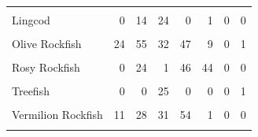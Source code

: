 \documentclass[
]{article}
\begin{document}
\begin{table}
\begin{tabular}[t]{lrrrrrrr}
\cellcolor{gray!6}{Kelp Rockfish} & \cellcolor{gray!6}{0} & \cellcolor{gray!6}{17} & \cellcolor{gray!6}{10} & \cellcolor{gray!6}{0} & \cellcolor{gray!6}{0} & \cellcolor{gray!6}{0} & \cellcolor{gray!6}{1}\\
Lingcod & 0 & 14 & 24 & 0 & 1 & 0 & 0\\
\cellcolor{gray!6}{Olive or Yellowtail Rockfish} & \cellcolor{gray!6}{0} & \cellcolor{gray!6}{0} & \cellcolor{gray!6}{1} & \cellcolor{gray!6}{0} & \cellcolor{gray!6}{0} & \cellcolor{gray!6}{0} & \cellcolor{gray!6}{0}\\
\addlinespace
Olive Rockfish & 24 & 55 & 32 & 47 & 9 & 0 & 1\\
\cellcolor{gray!6}{Quillback Rockfish} & \cellcolor{gray!6}{0} & \cellcolor{gray!6}{0} & \cellcolor{gray!6}{0} & \cellcolor{gray!6}{63} & \cellcolor{gray!6}{19} & \cellcolor{gray!6}{0} & \cellcolor{gray!6}{0}\\
Rosy Rockfish & 0 & 24 & 1 & 46 & 44 & 0 & 0\\
\cellcolor{gray!6}{Starry Rockfish} & \cellcolor{gray!6}{0} & \cellcolor{gray!6}{0} & \cellcolor{gray!6}{1} & \cellcolor{gray!6}{4} & \cellcolor{gray!6}{0} & \cellcolor{gray!6}{0} & \cellcolor{gray!6}{1}\\
Treefish & 0 & 0 & 25 & 0 & 0 & 0 & 1\\
\addlinespace
\cellcolor{gray!6}{UnID Blue Rockfish} & \cellcolor{gray!6}{0} & \cellcolor{gray!6}{0} & \cellcolor{gray!6}{0} & \cellcolor{gray!6}{0} & \cellcolor{gray!6}{1} & \cellcolor{gray!6}{0} & \cellcolor{gray!6}{0}\\
Vermilion Rockfish & 11 & 28 & 31 & 54 & 1 & 0 & 0\\
\cellcolor{gray!6}{Yellowtail Rockfish} & \cellcolor{gray!6}{36} & \cellcolor{gray!6}{19} & \cellcolor{gray!6}{13} & \cellcolor{gray!6}{120} & \cellcolor{gray!6}{27} & \cellcolor{gray!6}{0} & \cellcolor{gray!6}{0}\\
\bottomrule
\end{tabular}
\end{table}

\clearpage
\newpage
\end{document}
